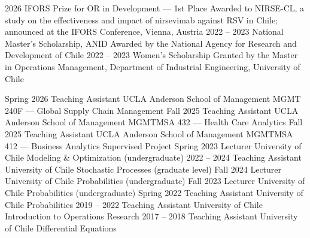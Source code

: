 \documentclass[10pt]{developercv} %
\begin{document}
\vspace{-6pt}
\begin{entrylist}
    \entry
		{2026}
		{IFORS Prize for OR in Development --- 1st Place}
		{}
		{Awarded to NIRSE-CL, a study on the effectiveness and impact of nirsevimab against RSV in Chile; announced at the IFORS Conference, Vienna, Austria}
    \entry
        {2022 -- 2023}
		{National Master's Scholarship, ANID}
		{}
		{Awarded by the National Agency for Research and Development of Chile}
    \entry
		{2022 -- 2023}
		{Women's Scholarship}
		{}
		{Granted by the Master in Operations Management, Department of Industrial Engineering, University of Chile}
\end{entrylist}

\vspace{-6pt}
\begin{entrylist}
	\entry
        {Spring 2026}
		{Teaching Assistant}
		{UCLA Anderson School of Management}
		{MGMT 240F --- Global Supply Chain Management}
	\entry
        {Fall 2025}
		{Teaching Assistant}
		{UCLA Anderson School of Management}
		{MGMTMSA 432 --- Health Care Analytics}
	\entry
        {Fall 2025}
		{Teaching Assistant}
		{UCLA Anderson School of Management}
		{MGMTMSA 412 --- Business Analytics Supervised Project}
	\entry
        {Spring 2023}
		{Lecturer}
		{University of Chile}
		{Modeling \& Optimization (undergraduate)}
  	\entry
		{2022 -- 2024}
		{Teaching Assistant}
		{University of Chile}
		{Stochastic Processes (graduate level)}
	\entry
        {Fall 2024}
		{Lecturer}
		{University of Chile}
		{Probabilities (undergraduate)}
	\entry
        {Fall 2023}
		{Lecturer}
		{University of Chile}
		{Probabilities (undergraduate)}
	\entry
		{Spring 2022}
		{Teaching Assistant}
		{University of Chile}
		{Probabilities}
	\entry
		{2019 -- 2022}
		{Teaching Assistant}
		{University of Chile}
		{Introduction to Operations Research}
	\entry
		{2017 -- 2018}
        {Teaching Assistant}
		{University of Chile}
		{Differential Equations}
\end{entrylist}
\end{document}
